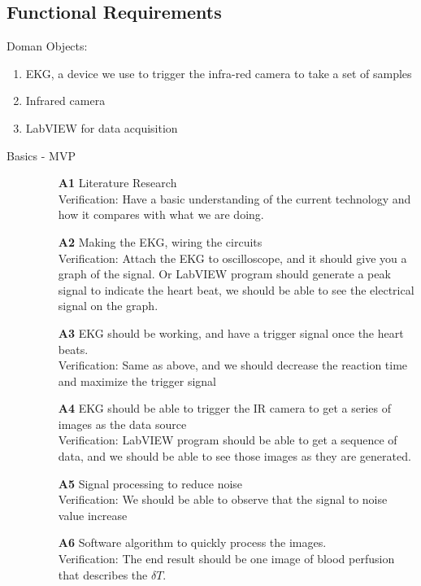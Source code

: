 \documentclass[paper=letter, fontsize=11pt]{scrartcl}
\numberwithin{equation}{section}		%
\numberwithin{figure}{section}			%
\numberwithin{table}{section}			%
\begin{document}
\subsection{Functional Requirements}
Doman Objects: 
\begin{enumerate}{}
	\item EKG, a device we use to trigger the infra-red camera to take a set of samples
	\item Infrared camera
	\item LabVIEW for data acquisition
\end{enumerate}
\begin{description}

   \item[Basics - MVP] \hspace{1cm}
   	\begin{itemize}
   	\item[\textbf{A1}] Literature Research\\
   	\hfill Verification: Have a basic understanding of the current technology and how it compares with what we are doing.
	\item[\textbf{A2}] Making the EKG, wiring the circuits\\
	\hfill Verification: Attach the EKG to oscilloscope, and it should give you a graph of the signal. Or LabVIEW program should generate a peak signal to indicate the heart beat, we should be able to see the electrical signal on the graph.
   	\item[\textbf{A3}]  EKG should be working, and have a trigger signal once the heart beats.\\
    	\hfill Verification: Same as above, and we should decrease the reaction time and maximize the trigger signal
   	\item[\textbf{A4}]  EKG should be able to trigger the IR camera to get a series of images as the data source\\
    	\hfill Verification: LabVIEW program should be able to get a sequence of data, and we should be able to see those images as they are generated.
   	\item[\textbf{A5}]  Signal processing to reduce noise\\
   	\hfill Verification: We should be able to observe that the signal to noise value increase
	\item[\textbf{A6}] Software algorithm to quickly process the images. \\
   	\hfill Verification: The end result should be one image of blood perfusion that describes the $\delta T$.   
\end{itemize}
  

\end{description}
\end{document}
